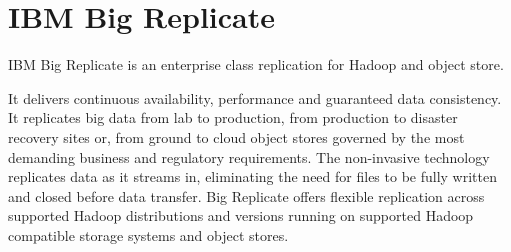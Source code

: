 \section{IBM Big Replicate}

IBM Big Replicate is an enterprise class replication for Hadoop and object 
store.

It delivers continuous availability, performance and guaranteed data 
consistency. It replicates big data from lab to production, from production to 
disaster recovery sites or, from ground to cloud object stores governed by the
most demanding business and regulatory requirements. The non-invasive 
technology replicates data as it streams in, eliminating the need for files 
to be fully written and closed before data transfer. Big Replicate offers 
flexible replication across supported Hadoop distributions and versions running
on supported Hadoop compatible storage systems and object stores.
\cite{IBM Big Replicate}
